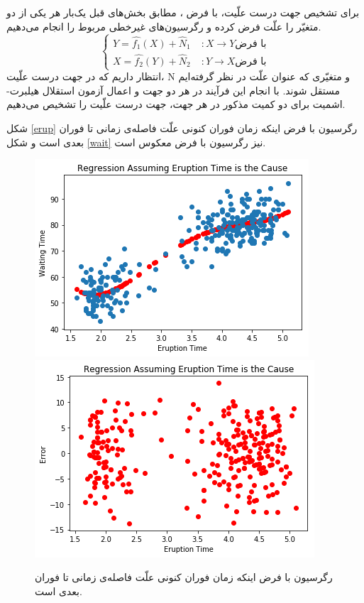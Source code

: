\documentclass{article}
\begin{document}
برای تشخیص جهت درست علّیت،  با فرض ، مطابق بخش‌های قبل یک‌بار هر یکی از دو متغیّر را علّت فرض کرده و رگرسیون‌های غیرخطی مربوط را انجام می‌دهیم.  
$$
\begin{cases}
Y = \hat{f_1}(X) + \hat{N}_1 &\;  :X \rightarrow Y \text{با فرض}  \\
X = \hat{f_2}(Y) + \hat{N}_2 &\;  :Y \rightarrow X \text{با فرض}
\end{cases}
$$
انتظار داریم که در جهت درست علّیت، N و متغیّری که عنوان علّت در نظر گرفته‌ایم مستقل شوند. با انجام این فرآیند در هر دو جهت و اعمال آزمون استقلال هیلبرت-اشمیت برای دو کمیت مذکور در هر جهت، جهت درست علّیت را تشخیص می‌دهیم.

شکل \eqref{erup} رگرسیون با فرض اینکه زمان فوران کنونی علّت فاصله‌ی زمانی تا فوران بعدی است و شکل \eqref{wait} نیز رگرسیون با فرض معکوس است.
\begin{figure}[h]
\begin{floatrow}
\centering
\includegraphics[scale=0.451]{erup_time1.png}
\includegraphics[scale=0.451]{erup_time2.png}
\end{floatrow}
\caption{رگرسیون با فرض اینکه زمان فوران کنونی علّت فاصله‌ی زمانی تا فوران بعدی است.}
\label{erup}
\end{figure}
\end{document}
